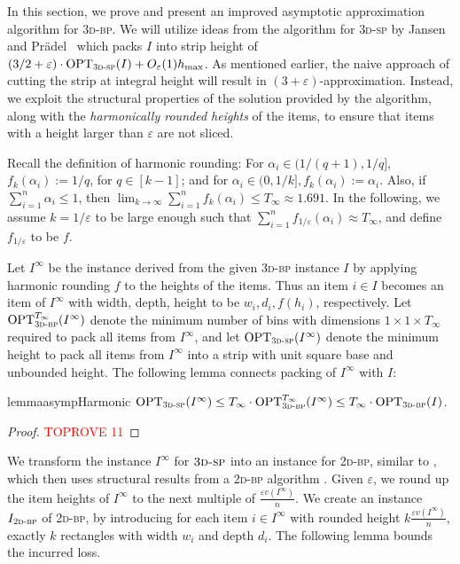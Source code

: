 \documentclass[a4paper,UKenglish,cleveref, autoref, thm-restate]{lipics-v2021}
\newcommand{\eps}{\varepsilon}
\newcommand{\opt}{\mathrm{OPT}}
\newcommand{\twobp}{\textsc{2d-bp}\xspace}
\newcommand{\tbp}{\textsc{3d-bp}\xspace}
\newcommand{\tsp}{\textsc{3d-sp}\xspace}
\begin{document}
In this section, we prove  and present an improved asymptotic approximation algorithm for \tbp.  
We will utilize ideas from the algorithm for \tsp by Jansen and Prädel~\cite{3d-strip-packing} which  packs $I$ into strip height of $(3/2+\varepsilon) \cdot \opt_{\tsp}(I) + O_{\eps}(1)h_{\max}$.
As mentioned earlier, the naive approach of cutting the strip at integral height will result in  $(3+\eps)$-approximation. 
Instead, we exploit the structural properties of the solution provided by the algorithm, along with the {\em harmonically rounded heights} of the items, to ensure that items with a height larger than $\eps$ are not sliced.

Recall the definition of harmonic rounding: 
For $\alpha_i\in(1/(q+1),1/q]$, $f_k(\alpha_i):=1/q$, for $q \in [k-1]$; and for $\alpha_i \in(0,1/k], f_k(\alpha_i):=\alpha_i$.
Also, if $\sum_{i=1}^n \alpha_i \le 1$,
then $\lim_{k \rightarrow \infty} \sum_{i=1}^n  f_k(\alpha_i) \le T_{\infty} \approx 1.691$. In the following, we assume $k=1/\eps$ to be large enough such that $\sum_{i=1}^n  f_{1/\eps}(\alpha_i)\approx T_{\infty}$, and define $f_{1/\eps}$ to be $f$. 

Let \( I^{\infty} \) be the instance derived from the given \tbp instance \( I \) by applying harmonic rounding $f$ to the heights of the items.
Thus an item $i \in I$ becomes an item of  $I^{\infty}$ with width, depth, height to be $w_i, d_i, f(h_i)$, respectively. 
Let \( \opt_{\tbp}^{T_\infty}(I^{\infty}) \) denote the minimum number of bins with dimensions \( 1 \times 1 \times T_{\infty} \) required to pack all items from \( I^{\infty} \), and let \( \opt_{\tsp}(I^{\infty}) \) denote the minimum height to pack all items from \( I^{\infty} \) into a strip with unit square base and unbounded height. 
The following lemma connects packing of $I^{\infty}$ with $I$:

\begin{restatable}{lemma}{asympHarmonic}
\label{lem:asymp-harmonic}
\( \opt_{\tsp}(I^{\infty}) \leq T_{\infty} \cdot  \opt_{\tbp}^{T_\infty}(I^{\infty}) \leq T_{\infty}\cdot \opt_{\tbp}(I) \).
\end{restatable}

\begin{proof}\textcolor{red}{TOPROVE 11}\end{proof}


We transform the instance $I^{\infty}$ for $\tsp$ into an instance for \twobp, similar to \cite{3d-strip-packing}, which then uses structural results from a {\twobp} algorithm \cite{jansen2016new}.
Given $\eps$, we round up the item heights of $I^{\infty}$  to the next multiple of $\frac{\eps v(I^{\infty})}{n}$.
We create an instance $I_{\twobp}$ of \twobp, by introducing for each item $i \in I^{\infty}$ with rounded height $k \frac{\eps v(I^{\infty})}{n}$, exactly $k$ rectangles with width $w_i$ and depth $d_i$. The following lemma bounds the incurred loss. 
\end{document}
